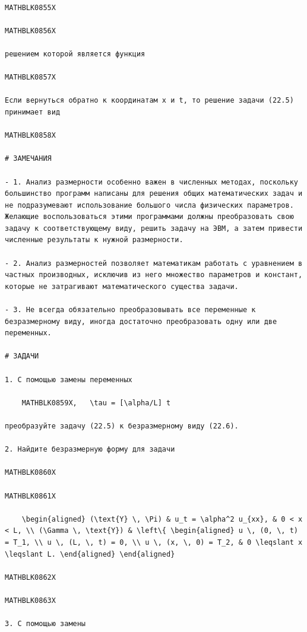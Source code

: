 \documentclass[
]{article}
\begin{document}
\begin{verbatim}

MATHBLK0855X

MATHBLK0856X

решением которой является функция

MATHBLK0857X

Если вернуться обратно к координатам x и t, то решение задачи (22.5) принимает вид

MATHBLK0858X

# ЗАМЕЧАНИЯ

- 1. Анализ размерности особенно важен в численных методах, поскольку большинство программ написаны для решения общих математических задач и не подразумевают использование большого числа физических параметров. Желающие воспользоваться этими программами должны преобразовать свою задачу к соответствующему виду, решить задачу на ЭВМ, а затем привести численные результаты к нужной размерности.

- 2. Анализ размерностей позволяет математикам работать с уравнением в частных производных, исключив из него множество параметров и констант, которые не затрагивают математического существа задачи.

- 3. Не всегда обязательно преобразовывать все переменные к безразмерному виду, иногда достаточно преобразовать одну или две переменных.

# ЗАДАЧИ

1. С помощью замены переменных

    MATHBLK0859X,   \tau = [\alpha/L] t

преобразуйте задачу (22.5) к безразмерному виду (22.6).

2. Найдите безразмерную форму для задачи

MATHBLK0860X

MATHBLK0861X

    \begin{aligned} (\text{Y} \, \Pi) & u_t = \alpha^2 u_{xx}, & 0 < x < L, \\ (\Gamma \, \text{Y}) & \left\{ \begin{aligned} u \, (0, \, t) = T_1, \\ u \, (L, \, t) = 0, \\ u \, (x, \, 0) = T_2, & 0 \leqslant x \leqslant L. \end{aligned} \end{aligned}

MATHBLK0862X

MATHBLK0863X

3. С помощью замены


\end{verbatim}
\end{document}

